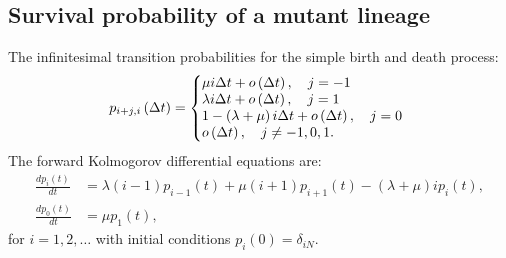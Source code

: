 \documentclass[12pt]{extarticle}
\begin{document}
\begin{appendices}
\section{Survival probability of a mutant lineage}\label{AppendixSurvLin}
The infinitesimal transition probabilities for the simple birth and death process:
\begin{align*}
p_{i+j,i}\left(\Delta t\right)=\left\{
  \begin{array}{@{}ll@{}}
  \mu i\Delta t+o\left(\Delta t\right),\quad j=-1 \\
  \lambda i\Delta t+o\left(\Delta t\right),\quad j=1 \\
    1-\left(\lambda+\mu\right) i\Delta t+o\left(\Delta t\right),\quad j=0 \\
   o\left(\Delta t\right),\quad j\neq-1,0,1.
  \end{array}\right.
\end{align*}
The forward Kolmogorov differential equations are:
\begin{subequations}
\label{KolmeqSurv}
\begin{flalign}
\frac{dp_i\left(t\right)}{dt}&=\lambda\left(i-1\right)p_{i-1}\left(t\right)+\mu\left(i+1\right)p_{i+1}\left(t\right)-\left(\lambda+\mu\right)ip_i\left(t\right),\\
\frac{dp_0\left(t\right)}{dt}&=\mu p_1\left(t\right),
\end{flalign}
\end{subequations}
for $i=1,2,\dots$ with initial conditions $p_i\left(0\right)=\delta_{iN}$.


\end{appendices}
\end{document}
